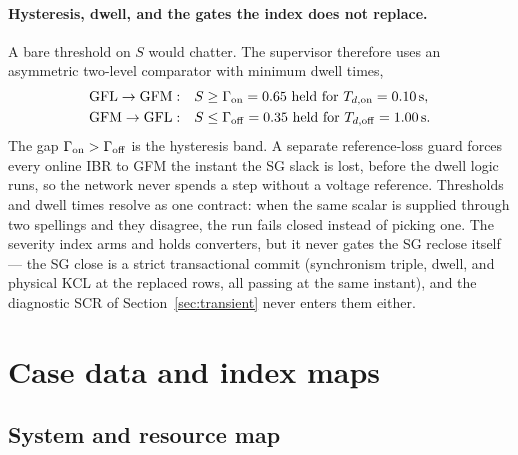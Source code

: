 \documentclass[12pt,a4paper]{article}
\newcommand{\second}{\ifmmode\,\mathrm{s}\else\ s\fi}
\begin{document}
\paragraph{Hysteresis, dwell, and the gates the index does not replace.}
A bare threshold on $S$ would chatter.  The supervisor therefore uses an
asymmetric two-level comparator with minimum dwell times,
\begin{equation}
  \begin{aligned}
    \text{GFL}\to\text{GFM}:&\quad S\ge\Gamma_{\rm on}=0.65
       \ \text{held for}\ T_{d,\rm on}=0.10\second,\\
    \text{GFM}\to\text{GFL}:&\quad S\le\Gamma_{\rm off}=0.35
       \ \text{held for}\ T_{d,\rm off}=1.00\second.
  \end{aligned}
  \label{eq:hyst}
\end{equation}
The gap $\Gamma_{\rm on}>\Gamma_{\rm off}$ is the hysteresis band.  A separate
reference-loss guard forces every online IBR to GFM the instant the SG slack
is lost, before the dwell logic runs, so the network never spends a step
without a voltage reference.  Thresholds and dwell times resolve as one
contract: when the same scalar is supplied through two spellings and they
disagree, the run fails closed instead of picking one.  The severity index
arms and holds converters, but it never gates the SG reclose itself --- the
SG close is a strict transactional commit (synchronism triple, dwell, and
physical KCL at the replaced rows, all passing at the same instant), and the
diagnostic SCR of Section~\ref{sec:transient} never enters them either.

\section{Case data and index maps}

\subsection{System and resource map}
\end{document}
